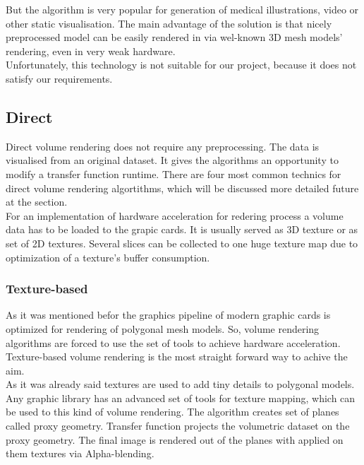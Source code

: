 \documentclass[twoside, english, 11pt]{report}
\begin{document}
But the algorithm is very popular for generation of medical illustrations, video or other static visualisation. The main advantage of the solution is that nicely preprocessed model can be easily rendered in via wel-known 3D mesh models' rendering, even in very weak hardware.\\

Unfortunately, this technology is not suitable for our project, because it does not satisfy our requirements.

\subsection{Direct}
Direct volume rendering does not require any preprocessing. The data is visualised from an original dataset. It gives the algorithms an opportunity to modify a transfer function runtime. There are four most common technics for direct volume rendering algortithms, which will be discussed more detailed future at the section.\\

For an implementation of hardware acceleration for redering process a volume data has to be loaded to the grapic cards. It is usually served as 3D texture or as set of 2D textures. Several slices can be collected to one huge texture map due to optimization of  a texture's buffer consumption. 

\subsubsection{Texture-based}

As it was mentioned befor the graphics pipeline of modern graphic cards is optimized for rendering of polygonal mesh models. So, volume rendering algorithms are forced to use the set of tools to achieve hardware acceleration. Texture-based volume rendering is the most straight forward way to achive the aim.\\

As it was already said textures are used to add tiny details to polygonal models. Any graphic library has an advanced set of tools for texture mapping, which can be used to this kind of volume rendering. The algorithm creates set of planes called proxy geometry. Transfer function projects the volumetric dataset on the proxy geometry. The final image is rendered out of the planes with applied on them textures via Alpha-blending.\\
\end{document}

